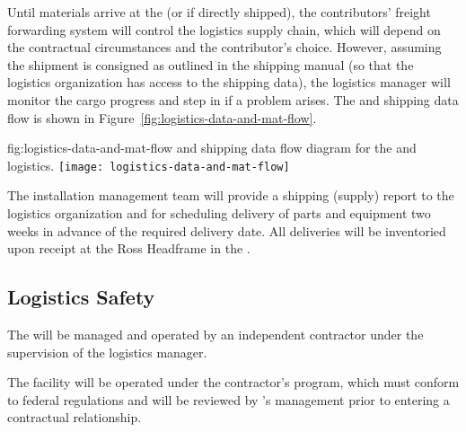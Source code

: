 Until materials arrive at the  (or  if directly shipped), the contributors' freight forwarding system will control the logistics supply chain, which will depend on the contractual circumstances and the contributor's choice. 
However, assuming the shipment is consigned as outlined in the  shipping manual (so that the 
logistics organization has access to the shipping data),  the logistics manager will monitor the cargo progress and step in if a problem arises. 
The  and shipping data flow is shown in Figure~\ref{fig:logistics-data-and-mat-flow}.

 


\begin{dunefigure}{fig:logistics-data-and-mat-flow}
  { and shipping data flow diagram for the  and  logistics.}
 \texttt{[image: logistics-data-and-mat-flow]}
\end{dunefigure}

 
The  installation management team will provide a shipping (supply) report to the  logistics organization and  for scheduling delivery of parts and equipment two weeks in advance of the required delivery date. 
All deliveries will be inventoried upon receipt at the Ross Headframe in the . 




\subsection{Logistics Safety}
\label{sec:fdsp-tc-log-safety}


The  will be managed and operated by an independent contractor under the supervision of the logistics manager. 

The facility will be operated under the contractor's  program, which must conform to federal regulations and will be reviewed by 's  management prior to entering a contractual relationship.